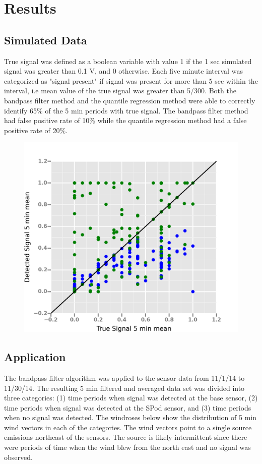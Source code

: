 \documentclass[fontsize=11pt]{scrartcl} %
\begin{document}
\newpage


\section{Results}
\subsection{Simulated Data} 

	
True signal was defined as a boolean variable with value 1 if the 1 sec simulated signal was greater than 0.1 V, and 0 otherwise. Each five minute interval was categorized as "signal present" if signal was present for more than 5 sec within the interval, i.e mean value of the true signal was greater than 5/300. 
Both the bandpass filter method and the quantile regression method were able to correctly identify 65\% of the 5 min periods with true signal. The bandpass filter method had false positive rate of 10\% while the quantile regression method had a false positive rate of 20\%.   

\begin{figure}[h!]
	\centering			
	\includegraphics[width=0.4\linewidth]{TrueVDetect}
\end{figure}

\subsection{Application}
The bandpass filter algorithm was applied to the sensor data from 11/1/14 to 11/30/14. The resulting 5 min filtered and averaged data set was divided into three categories: (1) time periods when signal was detected at the base sensor, (2) time periods when signal was detected at the SPod sensor, and (3) time periods when no signal was detected. The windroses below show the distribution of 5 min wind vectors in each of the categories. The wind vectors point to a single source emissions northeast of the sensors. The source is likely intermittent since there were periods of time when the wind blew from the north east and no signal was observed. 
\end{document}

